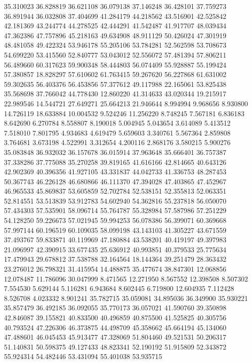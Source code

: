 35.310023
36.828819
36.621108
36.079138
37.146248
36.428101
37.759273
36.891944
36.032808
37.404699
41.284179
44.218562
43.516901
42.525842
42.181369
43.244774
44.278525
42.444291
41.542487
41.917707
48.039434
47.362386
47.757896
45.218163
49.634908
48.911129
50.426024
47.301919
48.481058
49.422324
53.946178
55.205106
53.784281
52.562598
53.708673
54.699220
53.415560
52.840777
53.043012
52.556072
57.481394
57.806211
56.489660
60.317623
59.900348
58.444803
56.074409
55.928887
55.199424
57.380857
18.828297
57.610602
61.763415
59.267620
56.227868
61.631002
59.302635
56.403376
56.453856
57.377612
49.117988
22.165061
53.825438
35.568698
37.766042
44.778430
12.860220
41.314633
43.020344
19.215917
22.989546
14.544721
27.649271
25.664213
21.946644
8.994994
9.968656
8.930800
14.726119
18.633884
10.004532
9.524246
11.256220
8.748245
7.567181
6.836183
8.642690
6.270784
8.558807
8.190018
5.004945
5.043654
3.614089
5.413512
7.518010
7.801795
4.934683
4.619479
5.659603
3.340761
5.567364
2.859808
3.764681
3.673198
4.522991
3.312654
4.200116
2.868176
3.580215
5.900276
35.083848
36.932032
36.157678
36.015914
37.963648
35.666401
36.757387
37.338286
37.775088
35.270258
39.819165
41.616166
42.814665
40.643126
42.902369
40.396356
41.927105
43.331837
44.042733
41.336753
48.287453
50.367743
46.226128
46.680866
46.111370
47.394028
47.403865
47.452967
46.965533
45.869837
53.605859
52.702784
52.538151
52.355813
52.063351
52.814551
53.513839
53.912783
54.602940
54.362816
55.237818
56.050070
57.434303
57.535901
58.096714
55.764787
55.328984
57.587986
57.251229
54.128250
59.226673
57.021945
59.994253
56.078386
56.399071
60.369668
57.997144
60.196519
60.109035
58.099198
43.143103
41.305227
43.671559
37.493767
59.833871
40.119969
47.180884
43.538201
40.419197
49.397983
21.096997
42.390915
33.677435
25.636912
40.993851
40.379533
25.775634
17.479943
29.678812
37.538788
32.164564
18.144364
39.251479
28.363432
23.276012
26.798321
31.415954
14.488875
35.477674
38.847301
12.068856
12.078487
11.786096
30.047999
8.471565
12.271950
8.567552
12.398508
8.507302
7.554530
5.629144
5.116281
6.943684
8.602445
6.719800
12.604935
7.112428
8.526708
4.023332
8.901241
35.782715
35.059081
34.895036
36.349900
35.930221
35.857479
36.492185
36.092055
35.770173
36.057021
41.590760
39.350898
42.846087
39.155821
40.833500
40.496859
40.875500
41.525825
40.305756
40.793524
47.226306
46.373875
44.498709
45.358662
45.664194
45.134060
47.488601
46.045453
45.913477
47.328069
51.804460
49.521531
50.206317
51.140831
50.598375
49.127433
48.823341
52.190192
51.915809
52.343872
55.924314
54.482446
53.431094
55.401038
53.935715
